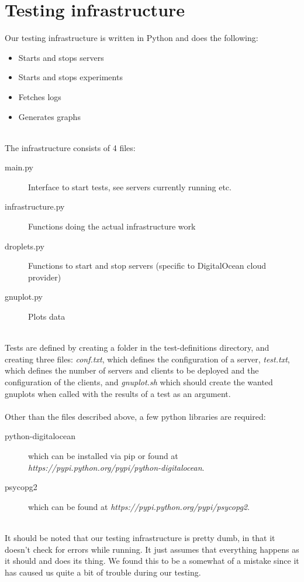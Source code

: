 \documentclass{article}
\begin{document}
    \section{Testing infrastructure}
        Our testing infrastructure is written in Python and does the following:
        \begin{itemize}
            \item Starts and stops servers
            \item Starts and stops experiments
            \item Fetches logs
            \item Generates graphs
        \end{itemize}
        ~\\
        The infrastructure consists of 4 files:
        \begin{description}
            \item[main.py] Interface to start tests, see servers currently running etc.
            \item[infrastructure.py] Functions doing the actual infrastructure work
            \item[droplets.py] Functions to start and stop servers (specific to DigitalOcean cloud provider)
            \item[gnuplot.py] Plots data
        \end{description}
        ~\\
        Tests are defined by creating a folder in the test-definitions directory, and creating three files: \textit{conf.txt}, which defines the configuration of a server, \textit{test.txt}, which defines the number of servers and clients to be deployed and the configuration of the clients, and \textit{gnuplot.sh} which should create the wanted gnuplots when called with the results of a test as an argument.\\
        \\
        Other than the files described above, a few python libraries are required: 
        \begin{description}
            \item[python-digitalocean] which can be installed via pip or found at \textit{https://pypi.python.org/pypi/python-digitalocean}.
            \item[psycopg2] which can be found at \textit{https://pypi.python.org/pypi/psycopg2}.
        \end{description}
        ~\\
        It should be noted that our testing infrastructure is pretty dumb, in that it doesn't check for errors while running. It just assumes that everything happens as it should and does its thing. We found this to be a somewhat of a mistake since it has caused us quite a bit of trouble during our testing.
\end{document}
